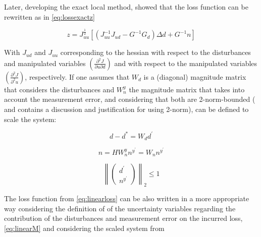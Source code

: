 \documentclass[../msc-thesis.tex]{subfiles}
\begin{document}
Later, \textcite{Halvorsen2003} developing the exact local method, showed that 
the loss function can be rewritten as in \autoref{eq:lossexactz}

\begin{equation}
	z=J_{u u}^{\frac{1}{2}}\left[\left(J_{u u}^{-1} J_{u d}-G^{-1} G_{d}\right) \Delta d+G^{-1} n\right]
	\label{eq:lossexactz}
\end{equation}

With $J_{ud}$ and $J_{uu}$ corresponding to the hessian with respect to the 
disturbances and manipulated variables 
$\left(\frac{\partial^{2} J}{\partial u \partial d}\right)$ and with respect to 
the manipulated variables $\left(\frac{\partial^{2} J}{\partial^{2} u}\right)$,
respectively. If one assumes that $W_d$ is a (diagonal) magnitude matrix that 
considers the disturbances and $W_{n}^y$ the magnitude matrix that takes into 
account the measurement error, and considering that both are 2-norm-bounded 
(\textcite{Halvorsen2003} and \textcite{Alstad2009} contains a discussion 
and justification for using 2-norm),  can be 
defined to scale the system:

\begin{equation}
	d-d^{*}=W_{d} d^{\prime}
	\label{eq:2norm1}
\end{equation}

\begin{equation}
	n=H W_{n}^{y} n^{y^{\prime}}=W_{n} n^{y^{\prime}}
	\label{eq:2norm2}
\end{equation}

\begin{equation}
	\left\|\left(\begin{array}{l}
		{d^{\prime}} \\
		{n^{y^{\prime}}}
		\end{array}\right)\right\|_{2} \leq 1
	\label{eq:2norm3}
\end{equation}

The loss function from \autoref{eq:linearloss} can be also written in a more 
appropriate way considering the definition of \cite{Alstad2009} of the 
uncertainty variables regarding the contribution of the disturbances and 
measurement error on the incurred loss, \autoref{eq:linearM} and considering 
the scaled system from 
\end{document}
